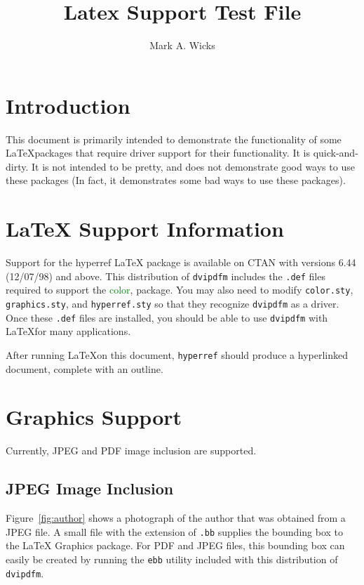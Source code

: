 \documentclass{article}
\title{\color{blue}Latex Support Test File}
\author{\color{green}Mark A. Wicks}
\begin{document}
\maketitle
\section{Introduction}
This document is primarily intended
to demonstrate the functionality
of some \LaTeX packages that require
driver support for their functionality.
It is quick-and-dirty.
It is not intended to be pretty, and
does not demonstrate good ways to use these packages
(In fact, it demonstrates some bad ways to use these packages).

\section{LaTeX Support Information}
Support for the hyperref \LaTeX\space
package is available on CTAN with versions
6.44 (12/07/98) and above.
This distribution of {\tt dvipdfm} includes
the {\tt .def} files required to support
the \textcolor{green}{color},
 package.
You may also need to modify {\tt color.sty}, {\tt graphics.sty},
and {\tt hyperref.sty} so that they
recognize {\tt dvipdfm} as a driver.
Once these {\tt .def} files are installed,
you should be able to use {\tt dvipdfm}
with \LaTeX for many applications.

After running \LaTeX on this
document, {\tt hyperref}
should produce a hyperlinked
document, complete with an outline.

\newpage
\section{Graphics Support}
Currently, JPEG and PDF image
inclusion are supported.

\subsection{JPEG Image Inclusion}
Figure~\ref{fig:author}
shows a photograph of the author
that was obtained from a JPEG file.
A small file with the extension of {\tt .bb}
supplies the bounding box to the \LaTeX\space
Graphics package.  For PDF and JPEG files,
this bounding box can easily be created by running
the {\tt ebb} utility included with this
distribution of {\tt dvipdfm}.
\end{document}
